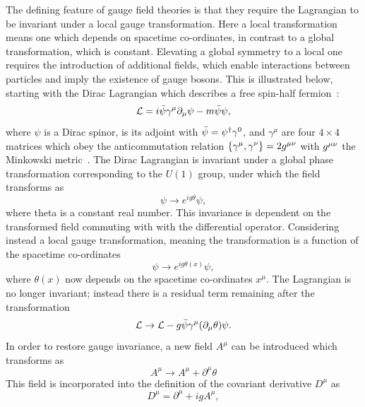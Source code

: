 The defining feature of gauge field theories is that they require the Lagrangian 
to be invariant under a local gauge transformation.
Here a local transformation means one which depends on spacetime co-ordinates, 
in contrast to a global transformation, which is constant.
Elevating a global symmetry to a local one requires the introduction of additional fields, 
which enable interactions between particles and imply the existence of gauge bosons.
This is illustrated below, starting with the Dirac Lagrangian 
which describes a free spin-half fermion~\cite{Dirac,Griffiths}:
\begin{equation}
\mathcal{L} = i \bar{\psi} \gamma^\mu \partial_\mu \psi - m\bar{\psi}\psi ,
\end{equation}
where $\psi$ is a Dirac spinor, \psibar is its adjoint with $\bar{\psi} = \psi^\dagger \gamma^0$, 
and $\gamma^\mu$ are four $4\times4$ matrices which obey the anticommutation relation
$\{\gamma^\mu,\gamma^\nu\} = 2g^{\mu\nu}$ with $g^{\mu\nu}$ the Minkowski metric~\cite{Griffiths}.
The Dirac Lagrangian is invariant under a global phase transformation 
corresponding to the $U(1)$ group, under which the field transforms as
\begin{equation}
\psi \rightarrow e^{ig\theta} \psi ,
\end{equation}
where theta is a constant real number.
This invariance is dependent on the transformed field commuting with
with the differential operator. 
Considering instead a local gauge transformation, 
meaning the transformation is a function of the spacetime co-ordinates
\begin{equation}
\psi \rightarrow e^{ig\theta(x)} \psi , 
\end{equation}
where $\theta(x)$ now depends on the spacetime co-ordinates $x^\mu$.
The Lagrangian is no longer invariant;
instead there is a residual term remaining after the transformation
\begin{equation}
\mathcal{L} \rightarrow \mathcal{L} - g \bar{\psi} \gamma^\mu (\partial_\mu \theta) \psi .
\end{equation}
In order to restore gauge invariance, a new field $A^{\mu}$ can be introduced 
which transforms as
\begin{equation}
A^\mu \rightarrow A^\mu + \partial^\mu \theta
\end{equation}
This field is incorporated into the definition of the covariant derivative $D^\mu$ as
\begin{equation}
\label{eq:theory_covdev}
D^\mu = \partial^\mu + i g A^\mu , 
\end{equation}
